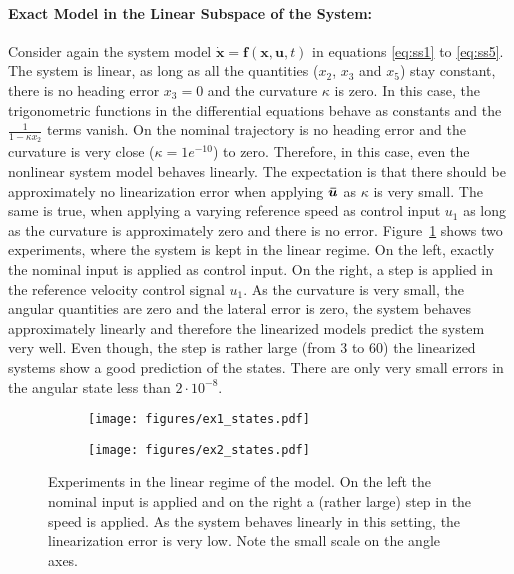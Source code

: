 \paragraph{Exact Model in the Linear Subspace of the System: }
Consider again the system model $\mathbf{\dot{x}} = \mathbf{f}(\mathbf{x}, \mathbf{u}, t)$ in equations \eqref{eq:ss1} to \eqref{eq:ss5}.
The system is linear, as long as all the quantities ($x_2$, $x_3$ and $x_5$) stay constant, there is no heading error $x_3 = 0$ and the curvature $\kappa$ is zero.
In this case, the trigonometric functions in the differential equations behave as constants and the $\frac{1}{1- \kappa x_2}$ terms vanish.
On the nominal trajectory is no heading error and the curvature is very close ($\kappa = 1e^{-10}$) to zero.
Therefore, in this case, even the nonlinear system model behaves linearly.
The expectation is that there should be approximately no linearization error when applying $\boldsymbol{\bar{u}}$ as $\kappa$ is very small.
The same is true, when applying a varying reference speed as control input $u_1$ as long as the curvature is approximately zero and there is no error.
Figure~\ref{fig:ex1_ex2} shows two experiments, where the system is kept in the linear regime.
On the left, exactly the nominal input is applied as control input.
On the right, a step is applied in the reference velocity control signal $u_1$.
As the curvature is very small, the angular quantities are zero and the lateral error is zero, the system behaves approximately linearly and therefore the linearized models predict the system very well.
Even though, the step is rather large (from $3$ to $60$) the linearized systems show a good prediction of the states.
There are only very small errors in the angular state less than $2\cdot 10^{-8}$.
\begin{figure}[h!]
	\centering
	\begin{subfigure}{0.49\textwidth}
	\texttt{[image: figures/ex1\_states.pdf]}
	\end{subfigure}
	\begin{subfigure}{0.49\textwidth}
	\texttt{[image: figures/ex2\_states.pdf]}
	\end{subfigure}
	\caption{Experiments in the linear regime of the model. On the left the nominal input is applied and on the right a (rather large) step in the speed is applied. As the system behaves linearly in this setting, the linearization error is very low. Note the small scale on the angle axes.}
	\label{fig:ex1_ex2}
\end{figure}

